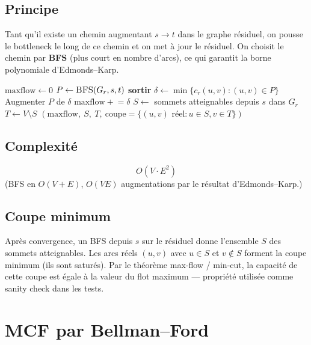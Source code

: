 \documentclass[11pt,a4paper]{article}
\newcommand{\Gres}{G_{r}}
\begin{document}
\subsection{Principe}

Tant qu'il existe un chemin augmentant $s \to t$ dans le graphe résiduel,
on pousse le bottleneck le long de ce chemin et on met à jour le résiduel.
On choisit le chemin par \textbf{BFS} (plus court en nombre d'arcs), ce
qui garantit la borne polynomiale d'Edmonds--Karp.

\begin{algorithm}[H]
\caption{Edmonds--Karp}
\begin{algorithmic}[1]
    \State $\text{maxflow} \gets 0$
        \State $P \gets \Call{BFS}{\Gres, s, t}$
         \textbf{sortir} \EndIf
        \State $\delta \gets \min \{c_r(u,v) : (u,v) \in P\}$
        \State Augmenter $P$ de $\delta$
        \State $\text{maxflow} \mathrel{+}= \delta$
    \EndWhile
    \State $S \gets$ sommets atteignables depuis $s$ dans $\Gres$
    \State $T \gets V \setminus S$
    \State \Return $(\text{maxflow},\ S,\ T,\ \text{coupe} = \{(u,v) \text{ réel} : u \in S, v \in T\})$
\EndFunction
\end{algorithmic}
\end{algorithm}

\subsection{Complexité}

\[
\boxed{\;O(V \cdot E^2)\;}
\]
(BFS en $O(V+E)$, $O(VE)$ augmentations par le résultat d'Edmonds--Karp.)

\subsection{Coupe minimum}

Après convergence, un BFS depuis $s$ sur le résiduel donne l'ensemble $S$
des sommets atteignables. Les arcs réels $(u, v)$ avec $u \in S$ et
$v \notin S$ forment la coupe minimum (ils sont saturés). Par le théorème
max-flow / min-cut, la capacité de cette coupe est égale à la valeur du
flot maximum --- propriété utilisée comme sanity check dans les tests.

\section{MCF par Bellman--Ford}
\label{sec:mcf-bf}
\end{document}
